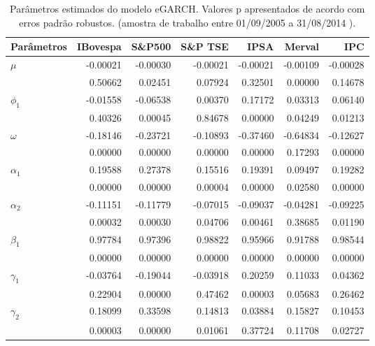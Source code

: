 \begin{table}[H]
\centering
\caption{Par\^ametros estimados do modelo eGARCH. Valores p apresentados de acordo com erros 
               padrão robustos. (amostra de trabalho entre 01/09/2005 a 31/08/2014 ).} 
\label{tab:garchcoef}
\begin{tabular}{lrrrrrr}
  \hline
Parâmetros & IBovespa & S\&P500 & S\&P TSE & IPSA & Merval & IPC \\ 
  \hline
$\mu$ & -0.00021 & -0.00030 & -0.00021 & -0.00021 & -0.00109 & -0.00028 \\ 
   & 0.50662 & 0.02451 & 0.07924 & 0.32501 & 0.00000 & 0.14678 \\ 
  $\phi_1$ & -0.01558 & -0.06538 & 0.00370 & 0.17172 & 0.03313 & 0.06140 \\ 
   & 0.40326 & 0.00045 & 0.84678 & 0.00000 & 0.04249 & 0.01213 \\ 
  $\omega$ & -0.18146 & -0.23721 & -0.10893 & -0.37460 & -0.64834 & -0.12627 \\ 
   & 0.00000 & 0.00000 & 0.00000 & 0.00000 & 0.17293 & 0.00000 \\ 
  $\alpha_1$ & 0.19588 & 0.27378 & 0.15516 & 0.19391 & 0.09497 & 0.19282 \\ 
   & 0.00000 & 0.00000 & 0.00004 & 0.00000 & 0.02580 & 0.00000 \\ 
  $\alpha_2$ & -0.11151 & -0.11779 & -0.07015 & -0.09037 & -0.04281 & -0.09225 \\ 
   & 0.00032 & 0.00030 & 0.04706 & 0.00461 & 0.38685 & 0.01190 \\ 
  $\beta_1$ & 0.97784 & 0.97396 & 0.98822 & 0.95966 & 0.91788 & 0.98544 \\ 
   & 0.00000 & 0.00000 & 0.00000 & 0.00000 & 0.00000 & 0.00000 \\ 
  $\gamma_1$ & -0.03764 & -0.19044 & -0.03918 & 0.20259 & 0.11033 & 0.04362 \\ 
   & 0.22904 & 0.00000 & 0.47462 & 0.00003 & 0.05683 & 0.26462 \\ 
  $\gamma_2$ & 0.18099 & 0.33598 & 0.14813 & 0.03884 & 0.15827 & 0.10453 \\ 
   & 0.00003 & 0.00000 & 0.01061 & 0.37724 & 0.11708 & 0.02727 \\ 
   \hline
\end{tabular}
\end{table}
